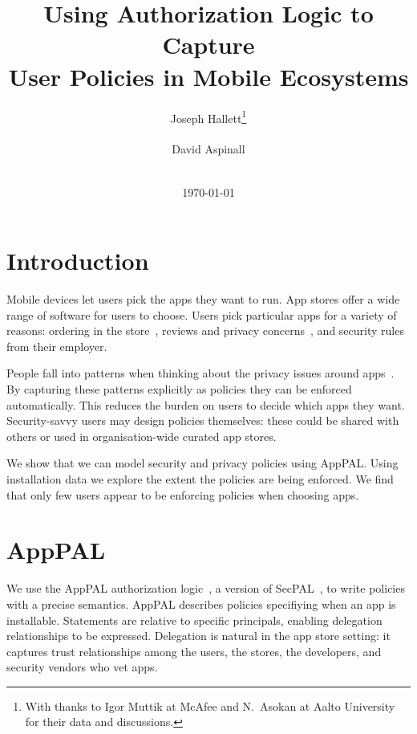 \documentclass[]{soups-poster}
\newcommand{\citep}[1]{\cite{#1}}
\begin{document}
\title{Using Authorization Logic to Capture\\User Policies in Mobile Ecosystems}
\author{%
  \alignauthor{}
  Joseph Hallett\thanks{With thanks to Igor Muttik at McAfee and N{.}~Asokan at Aalto University for their data and discussions.}\\
  \\
  \alignauthor{}
  David Aspinall\\
  \\
}
\date\today
\maketitle

\section{Introduction}


Mobile devices let users pick the apps they want to run.
App stores offer a wide range of software for users to choose.
Users pick particular apps for a variety of reasons:
  ordering in the store~\citep{Prata:2012in}, reviews and privacy concerns~\citep{Kelley:2013kc}, and security rules from their employer.

  People fall into patterns when thinking about the privacy issues around apps~\citep{Sadeh:2014vq}.
By capturing these patterns explicitly as policies they can be enforced automatically.
This reduces the burden on users to decide which apps they want.
Security-savvy users may design policies themselves:
  these could be shared with others or used in organisation-wide curated app stores.

We show that we can model security and privacy policies using AppPAL.
Using installation data we explore the extent the policies are being enforced.
We find that only few users appear to be enforcing policies when choosing apps.

%

\section{AppPAL}

We use the AppPAL authorization logic~\citep{Hallett:2014un}, a version of SecPAL~\citep{Becker:2006vh}, to write policies with a precise semantics.
AppPAL describes policies specifiying when an app is installable.
Statements are relative to specific principals, enabling delegation relationships to be expressed.
Delegation is natural in the app store setting: it captures trust relationships among the users, the stores, the developers, and security vendors who vet apps.
\end{document}

